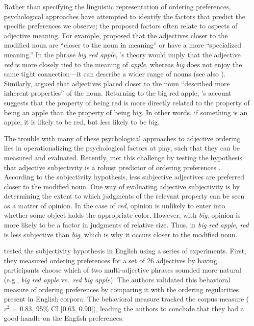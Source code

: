 \documentclass[12pt,letterpaper]{article}
\begin{document}

Rather than specifying the linguistic representation of ordering preferences, psychological approaches have attempted to identify the factors that predict the specific preferences we observe; the proposed factors often relate to aspects of adjective meaning. For example, \cite{Sweet1898} proposed that the adjectives closer to the modified noun are ``closer to the noun in meaning'' or have a more ``specialized meaning.'' In the phrase \emph{big red apple}, \citeauthor{Sweet1898}'s theory would imply that the adjective \emph{red} is more closely tied to the meaning of \emph{apple}, whereas \emph{big} does not enjoy the same tight connection---it can describe a wider range of nouns (see also \citealp{ziff1960}). Similarly, \cite{Whorf1945} argued that adjectives placed closer to the noun ``described more inherent properties'' of the noun. Returning to the big red apple, \citeauthor{Whorf1945}'s account suggests that the property of being red is more directly related to the property of being an apple than the property of being big. In other words, if something is an apple, it is likely to be red, but less likely to be big. 

The trouble with many of these psychological approaches to adjective ordering lies in operationalizing the psychological factors at play, such that they can be measured and evaluated. Recently, \cite{scontrasetal2017adjectives} met this challenge by testing the hypothesis that adjective subjectivity is a robust predictor of ordering preferences \citep{quirketal1985,hetzron1978,tucker1998,hill2012}. According to the subjectivity hypothesis, less subjective adjectives are preferred closer to the modified noun. One way of evaluating adjective subjectivity is by determining the extent to which judgments of the relevant property can be seen as a matter of opinion. In the case of \emph{red}, opinion is unlikely to enter into whether some object holds the appropriate color. However, with \emph{big}, opinion is more likely to be a factor in judgments of relative size. Thus, in \emph{big red apple}, \emph{red} is less subjective than \emph{big}, which is why it occurs closer to the modified noun.

\cite{scontrasetal2017adjectives} tested the subjectivity hypothesis in English using a series of experiments. First, they measured ordering preferences for a set of 26 adjectives by having participants choose which of two multi-adjective phrases sounded more natural (e.g., \emph{big red apple} vs.~\emph{red big apple}). The authors validated this behavioral measure of ordering preferences by comparing it with the ordering regularities present in English corpora. The behavioral measure tracked the corpus measure ($r^2$ = 0.83, 95\% CI [0.63, 0.90]), leading the authors to conclude that they had a good handle on the English preferences.
\end{document}
